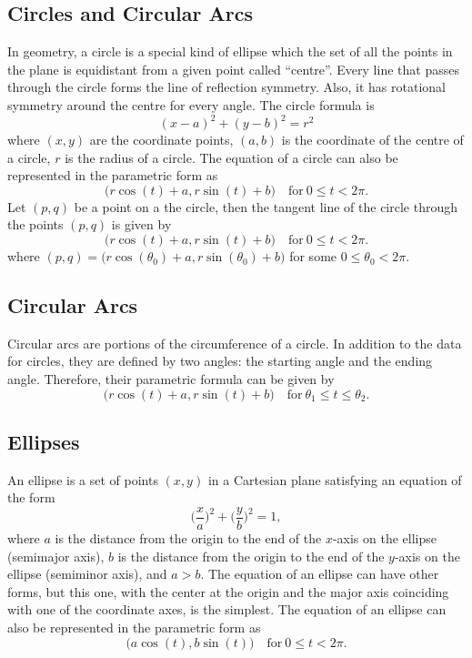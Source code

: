 \subsection{Circles and Circular Arcs}
In geometry, a circle is a special kind of ellipse which the set of all the points in the plane is equidistant from a given point called {\textquotedblleft}centre{\textquotedblright}.
Every line that passes through the circle forms the line of reflection symmetry.
Also, it has rotational symmetry around the centre for every angle.
The circle formula is
\begin{equation}
(x-a)^{2}+(y-b)^{2}=r^{2}\nonumber
\end{equation}
where $(x,y)$ are the coordinate points,
$(a,b)$ is the coordinate of the centre of a circle,
$r$ is the radius of a circle.
The equation of a circle can also be represented in the parametric form as
\begin{equation}
\bigl(r\cos(t)+a,r\sin(t)+b\bigr)\quad\text{for}\ 0\leq{}t<2\pi.\nonumber
\end{equation}
Let $(p,q)$ be a point on a the circle,
then the tangent line of the circle through the points $(p,q)$ is given by
\begin{equation}
\bigl(r\cos(t)+a,r\sin(t)+b\bigr)\quad\text{for}\ 0\leq{}t<2\pi.\nonumber
\end{equation}
where $(p,q)=\bigl(r\cos(\theta_{0})+a,r\sin(\theta_{0})+b\bigr)$ for some $0\leq\theta_{0}<2\pi$.

\subsection{Circular Arcs}
Circular arcs are portions of the circumference of a circle.
In addition to the data for circles, they are defined by two angles:
the starting angle and the ending angle.
Therefore, their parametric formula can be given by
\begin{equation}
\bigl(r\cos(t)+a,r\sin(t)+b\bigr)\quad\text{for}\ \theta_{1}\leq{}t\leq\theta_{2}.\nonumber
\end{equation}


\subsection{Ellipses}
An ellipse is a set of points $(x, y)$ in a Cartesian plane satisfying an equation of the form \begin{equation}
\biggl(\frac{x}{a}\biggr)^{2}+\biggl(\frac{y}{b}\biggr)^{2}=1,\nonumber
\end{equation}
where $a$ is the distance from the origin to the end of
the $x$-axis on the ellipse (semimajor axis),
$b$ is the distance from the origin to the end of
the $y$-axis on the ellipse (semiminor axis), and $a>b$.
The equation of an ellipse can have other forms, but this one,
with the center at the origin and the major axis coinciding with one of the coordinate axes,
is the simplest.
The equation of an ellipse can also be represented in the parametric form as
\begin{equation}
\bigl(a\cos(t),b\sin(t)\bigr)\quad\text{for}\ 0\leq{}t<2\pi.\nonumber
\end{equation}


